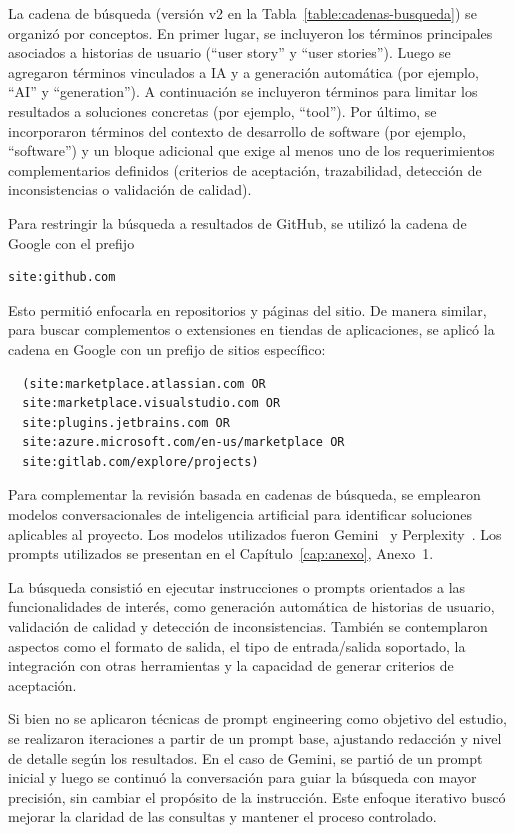 La cadena de búsqueda (versión v2 en la Tabla~\ref{table:cadenas-busqueda}) se organizó por conceptos. En primer lugar, se incluyeron los términos principales asociados a historias de usuario (``user story'' y ``user stories''). Luego se agregaron términos vinculados a IA y a generación automática (por ejemplo, ``AI'' y ``generation''). A continuación se incluyeron términos para limitar los resultados a soluciones concretas (por ejemplo, ``tool''). Por último, se incorporaron términos del contexto de desarrollo de software (por ejemplo, ``software'') y un bloque adicional que exige al menos uno de los requerimientos complementarios definidos (criterios de aceptación, trazabilidad, detección de inconsistencias o validación de calidad).

Para restringir la búsqueda a resultados de GitHub, se utilizó la cadena de Google con el prefijo 
\begin{verbatim}
site:github.com
\end{verbatim} 

Esto permitió enfocarla en repositorios y páginas del sitio. De manera similar, para buscar complementos o extensiones en tiendas de aplicaciones, se aplicó la cadena en Google con un prefijo de sitios específico:
\begin{verbatim}
  (site:marketplace.atlassian.com OR 
  site:marketplace.visualstudio.com OR
  site:plugins.jetbrains.com OR
  site:azure.microsoft.com/en-us/marketplace OR 
  site:gitlab.com/explore/projects)  
\end{verbatim}


Para complementar la revisión basada en cadenas de búsqueda, se emplearon modelos conversacionales de inteligencia artificial para identificar soluciones aplicables al proyecto. Los modelos utilizados fueron Gemini~\cite{gemini} y Perplexity~\cite{perplexity}. Los prompts utilizados se presentan en el Capítulo~\ref{cap:anexo}, Anexo~1.

La búsqueda consistió en ejecutar instrucciones o prompts orientados a las funcionalidades de interés, como generación automática de historias de usuario, validación de calidad y detección de inconsistencias. También se contemplaron aspectos como el formato de salida, el tipo de entrada/salida soportado, la integración con otras herramientas y la capacidad de generar criterios de aceptación.

Si bien no se aplicaron técnicas de prompt engineering como objetivo del estudio, se realizaron iteraciones a partir de un prompt base, ajustando redacción y nivel de detalle según los resultados. En el caso de Gemini, se partió de un prompt inicial y luego se continuó la conversación para guiar la búsqueda con mayor precisión, sin cambiar el propósito de la instrucción. Este enfoque iterativo buscó mejorar la claridad de las consultas y mantener el proceso controlado.

